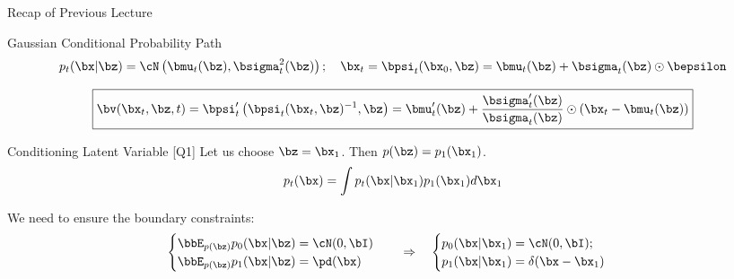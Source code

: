 \documentclass{beamer}
\begin{document}
\begin{frame}{Recap of Previous Lecture}
	\begin{block}{Gaussian Conditional Probability Path}
		\vspace{-0.5cm}
		\[
			p_t(\bx | \bz) = \cN\left(\bmu_t(\bz), \bsigma_t^2(\bz)\right); \quad \bx_t = \bpsi_t(\bx_0, \bz) = \bmu_t(\bz) + \bsigma_t(\bz) \odot \bepsilon
		\]
		\vspace{-0.5cm}
	\end{block}
	\vspace{-0.3cm}
	\[
		\boxed{\bv(\bx_t, \bz, t) = \bpsi_t'\left(\bpsi_t(\bx_t, \bz)^{-1}, \bz\right) = \bmu_t'(\bz) + \frac{\bsigma_t'(\bz)}{\bsigma_t(\bz)} \odot (\bx_t - \bmu_t(\bz))}
	\]
	\begin{block}{Conditioning Latent Variable [Q1]}
		Let us choose $\bz = \bx_1$. Then $p(\bz) = p_1(\bx_1)$.
		\[
			p_t(\bx) = \int p_t(\bx | \bx_1) p_1(\bx_1) d \bx_1
		\]
		\vspace{-0.5cm}
	\end{block}
	We need to ensure the boundary constraints:
	\[
		\begin{cases}
			\bbE_{p(\bz)} p_0(\bx | \bz) = \cN(0, \bI) \\
			\bbE_{p(\bz)} p_1(\bx | \bz) = \pd(\bx)
		\end{cases}
		\quad \Rightarrow \quad 
		\begin{cases}
			p_0(\bx | \bx_1) = \cN(0, \bI); \\
			p_1(\bx | \bx_1) = \delta(\bx - \bx_1)
		\end{cases}
	\]
	\vspace{-0.3cm}
\end{frame}
\end{document}
